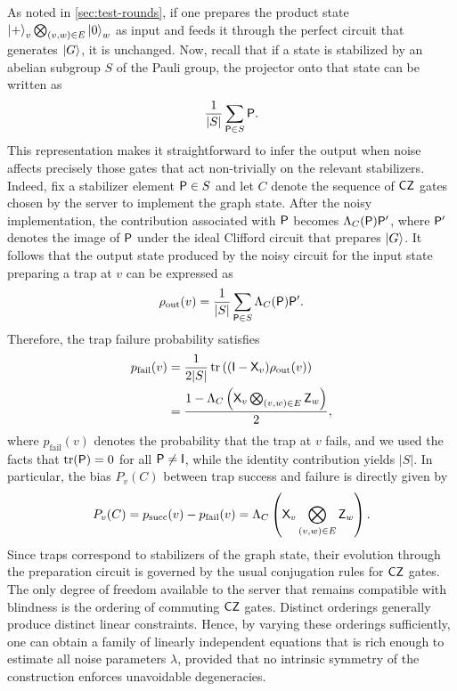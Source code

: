 As noted in \cref{sec:test-rounds}, if one prepares the product state \(\ket{+}_v \bigotimes_{(v,w)\in E} \ket{0}_w\) as input and feeds it through the perfect circuit that generates \(\ket{G}\), it is unchanged. Now, recall that if a state is stabilized by an abelian subgroup \(S\) of the Pauli group, the projector onto that state can be written as
\begin{equation}
\frac{1}{|S|}\sum_{\mathsf{P}\in S} \mathsf{P}.
\end{equation}
This representation makes it straightforward to infer the output when noise affects precisely those gates that act non-trivially on the relevant stabilizers. Indeed, fix a stabilizer element \(\mathsf{P}\in S\) and let \(C\) denote the sequence of \(\mathsf{CZ}\) gates chosen by the server to implement the graph state. After the noisy implementation, the contribution associated with \(\mathsf{P}\) becomes \(\Lambda_{C}(\mathsf{P}) \mathsf{P}'\), where \(\mathsf{P}'\) denotes the image of \(\mathsf{P}\) under the ideal Clifford circuit that prepares \(\ket{G}\). It follows that the output state produced by the noisy circuit for the input state preparing a trap at \(v\) can be expressed as
\begin{equation}
\rho_{\mathrm{out}}(v) = \frac{1}{|S|} \sum_{\mathsf{P}\in S}\Lambda_C(\mathsf{P})\mathsf{P}'.
\end{equation}
Therefore, the trap failure probability satisfies
\begin{align}\label{trap_failure}
  p_{\mathrm{fail}}(v)
  & = \frac{1}{2|S|} \tr\left((\mathsf{I} - \mathsf{X}_v) \rho_{\mathrm{out}}(v) \right) \\
  & =\frac{1-\Lambda_{C}\left(\mathsf{X}_v\bigotimes_{(v,w) \in E}\mathsf{Z}_w\right)}{2},
\end{align}
where \(p_{\mathrm{fail}}(v)\) denotes the probability that the trap at \(v\) fails, and we used the facts that \(\tr(\mathsf{P})=0\) for all \(\mathsf{P} \neq \mathsf{I}\), while the identity contribution yields \(|S|\). In particular, the bias $P_{v}(C)$ between trap success and failure is directly given by
\begin{equation}
P_v(C) = p_{\mathrm{succ}}(v)-p_{\mathrm{fail}}(v) = \Lambda_{C} \left( \mathsf{X}_v \bigotimes_{(v,w) \in E} \mathsf{Z}_w \right).
\end{equation}	
Since traps correspond to stabilizers of the graph state, their evolution through the preparation circuit is governed by the usual conjugation rules for \(\mathsf{CZ}\) gates. The only degree of freedom available to the server that remains compatible with blindness is the ordering of commuting \(\mathsf{CZ}\) gates. Distinct orderings generally produce distinct linear constraints. Hence, by varying these orderings sufficiently, one can obtain a family of linearly independent equations that is rich enough to estimate all noise parameters \(\lambda\), provided that no intrinsic symmetry of the construction enforces unavoidable degeneracies.

